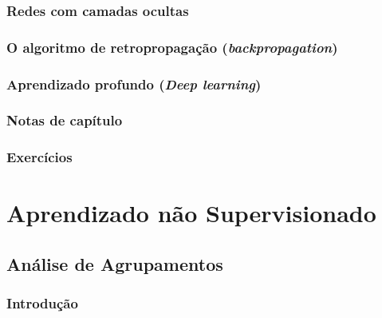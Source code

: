 \documentclass[
]{latex/krantz}
\theoremstyle{definition}
\theoremstyle{definition}
\theoremstyle{definition}
\theoremstyle{definition}
\theoremstyle{remark}
\begin{document}
\hypertarget{redes-com-camadas-ocultas}{%
\section{Redes com camadas ocultas}\label{redes-com-camadas-ocultas}}

\hypertarget{o-algoritmo-de-retropropagauxe7uxe3o-backpropagation}{%
\section{\texorpdfstring{O algoritmo de retropropagação (\emph{backpropagation})}{O algoritmo de retropropagação (backpropagation)}}\label{o-algoritmo-de-retropropagauxe7uxe3o-backpropagation}}

\hypertarget{aprendizado-profundo-deep-learning}{%
\section{\texorpdfstring{Aprendizado profundo (\emph{Deep learning})}{Aprendizado profundo (Deep learning)}}\label{aprendizado-profundo-deep-learning}}

\hypertarget{notas-de-capuxedtulo-10}{%
\section{Notas de capítulo}\label{notas-de-capuxedtulo-10}}

\hypertarget{exercuxedcios-10}{%
\section{Exercícios}\label{exercuxedcios-10}}

\hypertarget{part-aprendizado-nuxe3o-supervisionado}{%
\part{Aprendizado não Supervisionado}\label{part-aprendizado-nuxe3o-supervisionado}}

\hypertarget{anuxe1lise-de-agrupamentos}{%
\chapter{Análise de Agrupamentos}\label{anuxe1lise-de-agrupamentos}}

\hypertarget{introduuxe7uxe3o-11}{%
\section{Introdução}\label{introduuxe7uxe3o-11}}
\end{document}
